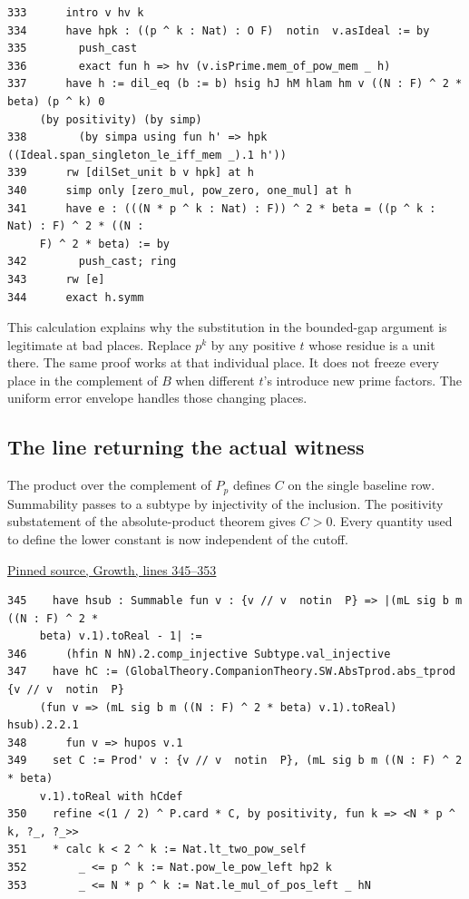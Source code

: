 \documentclass[12pt,letterpaper]{article}
\begin{document}
{\footnotesize\begin{verbatim}
333      intro v hv k
334      have hpk : ((p ^ k : Nat) : O F)  notin  v.asIdeal := by
335        push_cast
336        exact fun h => hv (v.isPrime.mem_of_pow_mem _ h)
337      have h := dil_eq (b := b) hsig hJ hM hlam hm v ((N : F) ^ 2 * beta) (p ^ k) 0
     (by positivity) (by simp)
338        (by simpa using fun h' => hpk ((Ideal.span_singleton_le_iff_mem _).1 h'))
339      rw [dilSet_unit b v hpk] at h
340      simp only [zero_mul, pow_zero, one_mul] at h
341      have e : (((N * p ^ k : Nat) : F)) ^ 2 * beta = ((p ^ k : Nat) : F) ^ 2 * ((N :
     F) ^ 2 * beta) := by
342        push_cast; ring
343      rw [e]
344      exact h.symm
\end{verbatim}
}

This calculation explains why the substitution in the bounded-gap argument is legitimate at bad places. Replace \(p^k\) by any positive \(t\) whose residue is a unit there. The same proof works at that individual place. It does not freeze every place in the complement of \(B\) when different \(t\)'s introduce new prime factors. The uniform error envelope handles those changing places.

\clearpage\subsection*{The line returning the actual witness}

The product over the complement of \(P_p\) defines \(C\) on the single baseline row. Summability passes to a subtype by injectivity of the inclusion. The positivity substatement of the absolute-product theorem gives \(C>0\). Every quantity used to define the lower constant is now independent of the cutoff.

\par\smallskip\href{https://github.com/nousentllc/riemann-hypothesis/blob/40e56bab026552e089d7afcfeff08d2defb9c005/src/CompanionTheory/SpectralGeometry/LocalGlobalProofs/AdelicAnalysis/RankOneLocalDensitiesProductConverges.lean#L345-L353}{\sffamily\small Pinned source, Growth, lines 345--353}\par

{\footnotesize\begin{verbatim}
345    have hsub : Summable fun v : {v // v  notin  P} => |(mL sig b m ((N : F) ^ 2 *
     beta) v.1).toReal - 1| :=
346      (hfin N hN).2.comp_injective Subtype.val_injective
347    have hC := (GlobalTheory.CompanionTheory.SW.AbsTprod.abs_tprod {v // v  notin  P}
     (fun v => (mL sig b m ((N : F) ^ 2 * beta) v.1).toReal) hsub).2.2.1
348      fun v => hupos v.1
349    set C := Prod' v : {v // v  notin  P}, (mL sig b m ((N : F) ^ 2 * beta)
     v.1).toReal with hCdef
350    refine <(1 / 2) ^ P.card * C, by positivity, fun k => <N * p ^ k, ?_, ?_>>
351    * calc k < 2 ^ k := Nat.lt_two_pow_self
352        _ <= p ^ k := Nat.pow_le_pow_left hp2 k
353        _ <= N * p ^ k := Nat.le_mul_of_pos_left _ hN
\end{verbatim}
}
\end{document}
